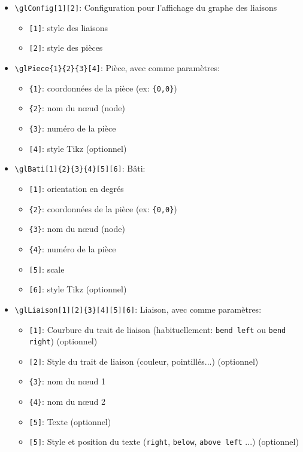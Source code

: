 \documentclass[11pt]{ltxdockit}[2010/09/26]
\begin{document}
\vspace{1em}
\begin{itemize}
\item \verb!\glConfig[1][2]!: Configuration pour l'affichage du graphe des liaisons
\begin{itemize}
\item \verb![1]!: style des liaisons
\item \verb![2]!: style des pièces
\end{itemize}
\item \verb!\glPiece{1}{2}{3}[4]!: Pièce, avec comme paramètres:
\begin{itemize}
\item \verb!{1}!: coordonnées de la pièce (ex: \verb!{0,0}!)
\item \verb!{2}!: nom du nœud (node)
\item \verb!{3}!: numéro de la pièce
\item \verb![4]!: style Tikz (optionnel)
\end{itemize}
\item \verb!\glBati[1]{2}{3}{4}[5][6]!: Bâti:
\begin{itemize}
\item \verb![1]!: orientation en degrés
\item \verb!{2}!: coordonnées de la pièce (ex: \verb!{0,0}!)
\item \verb!{3}!: nom du nœud (node)
\item \verb!{4}!: numéro de la pièce
\item \verb![5]!: scale
\item \verb![6]!: style Tikz (optionnel)
\end{itemize}
\item \verb!\glLiaison[1][2]{3}[4][5][6]!: Liaison, avec comme paramètres:
\begin{itemize}
\item \verb![1]!: Courbure du trait de liaison (habituellement: \verb!bend left! ou \verb!bend right!) (optionnel)
\item \verb![2]!: Style du trait de liaison (couleur, pointillés...) (optionnel)
\item \verb!{3}!: nom du nœud 1
\item \verb!{4}!: nom du nœud 2
\item \verb![5]!: Texte (optionnel)
\item \verb![5]!: Style et position du texte (\verb!right!, \verb!below!, \verb!above left! ...) (optionnel)
\end{itemize}
\end{itemize}
\end{document}

